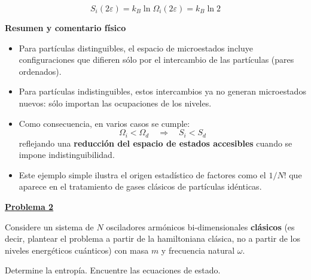 \documentclass{article}
\newenvironment{AGbox}[1][7]%
{%
  \begin{tcolorbox}[
    enhanced, breakable,
    colframe=AppleGreen,
    colback=AppleGreen!#1,
    boxrule=1pt,
    borderline west={2mm}{-10mm}{AppleGreen},
    sharp corners=southwest,
    left=14pt,right=14pt,top=10pt,bottom=10pt,
     boxsep=6pt,
  ]%
}{%
  \end{tcolorbox}%
}
\begin{document}
\[
S_{i}(2\varepsilon) = k_{B}\ln \Omega_{i}(2\varepsilon)
= k_{B}\ln 2
\]

\vspace{0.4cm}
\textcolor{Tarawera}{\textbf{Resumen y comentario físico}}

\begin{itemize}
  \item Para partículas distinguibles, el espacio de microestados incluye
        configuraciones que difieren sólo por el intercambio de las partículas
        (pares ordenados).
  \item Para partículas indistinguibles, estos intercambios ya no generan
        microestados nuevos: sólo importan las ocupaciones de los niveles.
  \item Como consecuencia, en varios casos se cumple:
        \[
          \Omega_{i} < \Omega_{d}
          \quad\Rightarrow\quad
          S_{i} < S_{d}
        \]
        reflejando una \textbf{reducción del espacio de estados accesibles}
        cuando se impone indistinguibilidad.
  \item Este ejemplo simple ilustra el origen estadístico de factores como
        el \(1/N!\) que aparece en el tratamiento de gases clásicos de partículas
        idénticas.
\end{itemize}








\begin{AGbox}[8]
\textcolor{Apple Green}{\textbf{\underline{Problema 2}}} \vspace{2mm}

Considere un sistema de \(N\) osciladores armónicos bi-dimensionales \textbf{clásicos}  
(es decir, plantear el problema a partir de la hamiltoniana clásica, no a partir  
de los niveles energéticos cuánticos) con masa \(m\) y frecuencia natural \(\omega\).  

Determine la entropía.  
Encuentre las ecuaciones de estado.

\end{AGbox}
\vspace{0.5cm}
\end{document}
